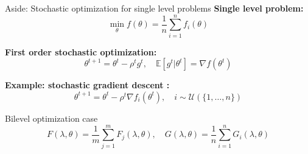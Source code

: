 \documentclass{beamer}
\begin{document}
\begin{frame}{Aside: Stochastic optimization for single level problems}
    \textbf{Single level problem:} $$\min_\theta f(\theta) = \frac1n \sum_{i=1}^n f_i(\theta)$$

    \vspace{.3cm}
    \pause
    \textbf{First order stochastic optimization:}
        $$
        \theta^{t+1} = \theta^t - \rho^t g^t,\quad \mathbb E[g^t|\theta^t] = \nabla f(\theta^t)
        $$

    \vspace{.3cm}
    \pause
    \textbf{Example: stochastic gradient descent :}
    $$
    \theta^{t+1} = \theta^t - \rho^t \nabla f_i(\theta^t),\quad i\sim\mathcal U(\{1,\dots,n\})
    $$
\end{frame}


\begin{frame}{Bilevel optimization case}
    $$F(\lambda, \theta) = \frac1m\sum_{j=1}^m F_j(\lambda, \theta),\quad G(\lambda, \theta) = \frac1n\sum_{i=1}^n G_i(\lambda, \theta)$$



\end{frame}
\end{document}
